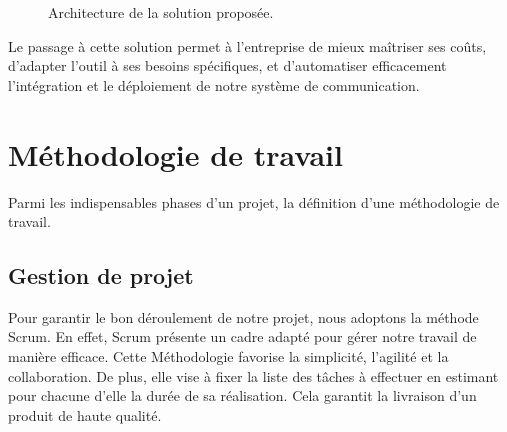 \begin{figure}[H]
        \centering
        \caption{Architecture de la solution proposée.}
        \label{fig:archi}
\end{figure}
        
Le passage à cette solution permet à l'entreprise de mieux maîtriser ses coûts, d'adapter l'outil à ses besoins spécifiques, et d'automatiser efficacement l'intégration et le déploiement de notre système de communication.

\section[Méthodologie de travail]{Méthodologie de travail}
Parmi les indispensables phases d’un projet, la définition d'une méthodologie de travail.

\subsection{Gestion de projet}
Pour garantir le bon déroulement de notre projet, nous adoptons la méthode Scrum. En effet, Scrum présente un cadre adapté pour gérer notre travail de manière efficace. Cette Méthodologie favorise la simplicité, l'agilité et la collaboration. De plus, elle vise à fixer la liste des tâches à effectuer en estimant pour chacune d’elle la durée de sa réalisation. Cela garantit la livraison d'un produit de haute qualité.

